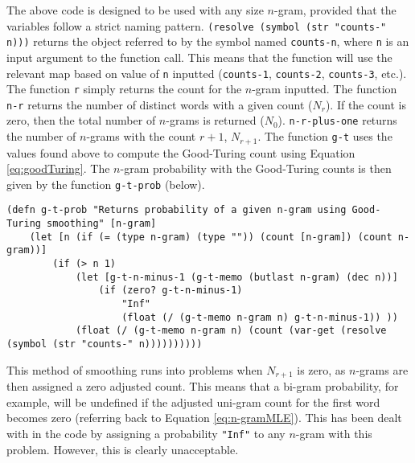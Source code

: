 The above code is designed to be used with any size $n$-gram, provided that the variables follow a strict naming pattern. \lstinline!(resolve (symbol (str "counts-" n)))! returns the object referred to by the symbol named \lstinline!counts-n!, where \lstinline!n! is an input argument to the function call. This means that the function will use the relevant map based on value of \lstinline!n! inputted (\lstinline!counts-1!, \lstinline!counts-2!, \lstinline!counts-3!, etc.). The function \lstinline!r! simply returns the count for the $n$-gram inputted. The function \lstinline!n-r! returns the number of distinct words with a given count ($N_{r}$). If the count is zero, then the total number of $n$-grams is returned ($N_{0}$). \lstinline!n-r-plus-one! returns the number of $n$-grams with the count $r+1$, $N_{r+1}$. The function \lstinline!g-t! uses the values found above to compute the Good-Turing count using Equation \ref{eq:goodTuring}. The $n$-gram probability with the Good-Turing counts is then given by the function \lstinline!g-t-prob! (below).

\begin{lstlisting}
(defn g-t-prob "Returns probability of a given n-gram using Good-Turing smoothing" [n-gram] 
	(let [n (if (= (type n-gram) (type "")) (count [n-gram]) (count n-gram))] 
		(if (> n 1)
			(let [g-t-n-minus-1 (g-t-memo (butlast n-gram) (dec n))]
				(if (zero? g-t-n-minus-1)
					"Inf"
					(float (/ (g-t-memo n-gram n) g-t-n-minus-1)) ))
			(float (/ (g-t-memo n-gram n) (count (var-get (resolve (symbol (str "counts-" n))))))))))
\end{lstlisting}

This method of smoothing runs into problems when $N_{r+1}$ is zero, as $n$-grams are then assigned a zero adjusted count. This means that a bi-gram probability, for example, will be undefined if the adjusted uni-gram count for the first word becomes zero (referring back to Equation \ref{eq:n-gramMLE}). This has been dealt with in the code by assigning a probability \lstinline!"Inf"! to any $n$-gram with this problem. However, this is clearly unacceptable.





